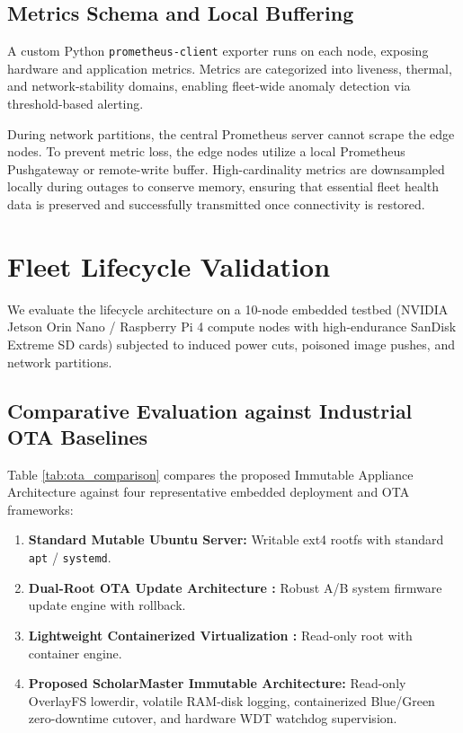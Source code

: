 \documentclass[conference]{IEEEtran}
\begin{document}
\subsection{Metrics Schema and Local Buffering}
A custom Python \texttt{prometheus-client} exporter runs on each node, exposing hardware and application metrics. Metrics are categorized into liveness, thermal, and network-stability domains, enabling fleet-wide anomaly detection via threshold-based alerting.

During network partitions, the central Prometheus server cannot scrape the edge nodes. To prevent metric loss, the edge nodes utilize a local Prometheus Pushgateway or remote-write buffer. High-cardinality metrics are downsampled locally during outages to conserve memory, ensuring that essential fleet health data is preserved and successfully transmitted once connectivity is restored.

\section{Fleet Lifecycle Validation}

We evaluate the lifecycle architecture on a 10-node embedded testbed (NVIDIA Jetson Orin Nano / Raspberry Pi 4 compute nodes with high-endurance SanDisk Extreme SD cards) subjected to induced power cuts, poisoned image pushes, and network partitions.

\subsection{Comparative Evaluation against Industrial OTA Baselines}
Table \ref{tab:ota_comparison} compares the proposed Immutable Appliance Architecture against four representative embedded deployment and OTA frameworks:
\begin{enumerate}
    \item \textbf{Standard Mutable Ubuntu Server:} Writable ext4 rootfs with standard \texttt{apt} / \texttt{systemd}.
    \item \textbf{Dual-Root OTA Update Architecture \cite{b26}:} Robust A/B system firmware update engine with rollback.
    \item \textbf{Lightweight Containerized Virtualization \cite{b27}:} Read-only root with container engine.
    \item \textbf{Proposed ScholarMaster Immutable Architecture:} Read-only OverlayFS lowerdir, volatile RAM-disk logging, containerized Blue/Green zero-downtime cutover, and hardware WDT watchdog supervision.
\end{enumerate}
\end{document}
